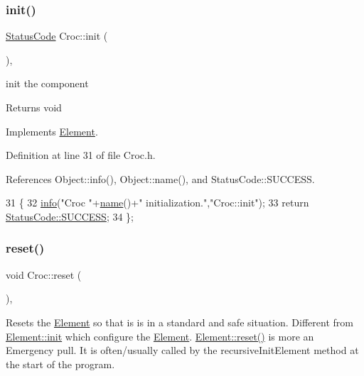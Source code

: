 \subsubsection{\texorpdfstring{init()}{init()}}
{\footnotesize\ttfamily \hyperlink{classStatusCode}{Status\+Code} Croc\+::init (\begin{DoxyParamCaption}{ }\end{DoxyParamCaption})\hspace{0.3cm}{\ttfamily [inline]}, {\ttfamily [virtual]}}

init the component

\begin{DoxyReturn}{Returns}
void 
\end{DoxyReturn}


Implements \hyperlink{classElement_af42754b5cabc198869222725218d695c}{Element}.



Definition at line 31 of file Croc.\+h.



References Object\+::info(), Object\+::name(), and Status\+Code\+::\+S\+U\+C\+C\+E\+SS.


\begin{DoxyCode}
31                     \{
32     \hyperlink{classObject_a644fd329ea4cb85f54fa6846484b84a8}{info}(\textcolor{stringliteral}{"Croc "}+\hyperlink{classObject_a300f4c05dd468c7bb8b3c968868443c1}{name}()+\textcolor{stringliteral}{" initialization."},\textcolor{stringliteral}{"Croc::init"});
33     \textcolor{keywordflow}{return} \hyperlink{classStatusCode_a6f565cbeadc76d14c72f047e5e85eb4badd0da38d3ba0d922efd1f4619bc37ad8}{StatusCode::SUCCESS};
34   \};
\end{DoxyCode}
\mbox{\label{classCroc_aa95453776f49e4affe375500e96eb906}} 
\subsubsection{\texorpdfstring{reset()}{reset()}}
{\footnotesize\ttfamily void Croc\+::reset (\begin{DoxyParamCaption}{ }\end{DoxyParamCaption})\hspace{0.3cm}{\ttfamily [inline]}, {\ttfamily [virtual]}}

Resets the \hyperlink{classElement}{Element} so that is is in a standard and safe situation. Different from \hyperlink{classElement_af42754b5cabc198869222725218d695c}{Element\+::init} which configure the \hyperlink{classElement}{Element}. \hyperlink{classElement_a69efffa22f06909d768149715565cb56}{Element\+::reset()} is more an Emergency pull. It is often/usually called by the recursive\+Init\+Element method at the start of the program. 

